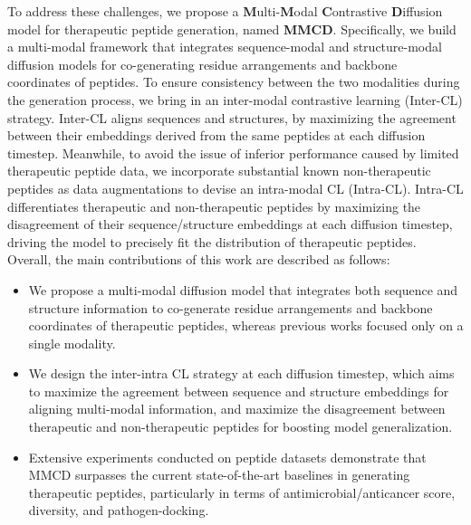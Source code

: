 \documentclass[letterpaper]{article}
\begin{document}
To address these challenges, we propose a \textbf{M}ulti-\textbf{M}odal \textbf{C}ontrastive \textbf{D}iffusion model for therapeutic peptide generation, named \textbf{MMCD}. Specifically, we build a multi-modal framework that integrates sequence-modal and structure-modal diffusion models for co-generating residue arrangements and backbone coordinates of peptides. To ensure consistency between the two modalities during the generation process, we bring in an inter-modal contrastive learning (Inter-CL) strategy. Inter-CL aligns sequences and structures, by maximizing the agreement between their embeddings derived from the same peptides at each diffusion timestep. Meanwhile, to avoid the issue of inferior performance caused by limited therapeutic peptide data, we incorporate substantial known non-therapeutic peptides as data augmentations to devise an intra-modal CL (Intra-CL). Intra-CL differentiates therapeutic and non-therapeutic peptides by maximizing the disagreement of their sequence/structure embeddings at each diffusion timestep, driving the model to precisely fit the distribution of therapeutic peptides. Overall, the main contributions of this work are described as follows:
\begin{itemize}
\item We propose a multi-modal diffusion model that integrates both sequence and structure information to co-generate residue arrangements and backbone coordinates of therapeutic peptides, whereas previous works focused only on a single modality.
\item We design the inter-intra CL strategy at each diffusion timestep, which aims to maximize the agreement between sequence and structure embeddings for aligning multi-modal information, and maximize the disagreement between therapeutic and non-therapeutic peptides for boosting model generalization.
\item Extensive experiments conducted on peptide datasets demonstrate that MMCD surpasses the current state-of-the-art baselines in generating therapeutic peptides, particularly in terms of antimicrobial/anticancer score, diversity, and pathogen-docking.
\end{itemize}
\end{document}

